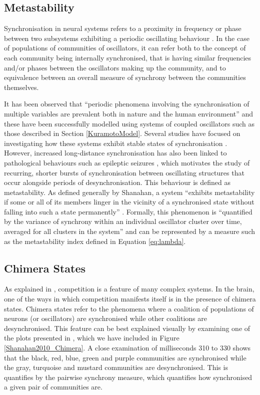 \documentclass[a4paper,11pt]{article}
\begin{document}
\subsection{Metastability}
\label{sec:bg:meta}
Synchronisation in neural systems refers to a proximity in frequency or phase between two subsystems exhibiting a periodic oscillating behaviour \cite{Abarbanel1996}. In the case of populations of communities of oscillators, it can refer both to the concept of each community being internally synchronised, that is having similar frequencies and/or phases between the oscillators making up the community, and to equivalence between an overall measure of synchrony between the communities themselves.

It has been observed that ``periodic phenomena involving the synchronisation of multiple variables are prevalent both in nature and the human environment'' \cite{Shanahan2010} and these have been successfully modelled using systems of coupled oscillators such as those described in Section \ref{KuramotoModel}. Several studies have focused on investigating how these systems exhibit stable states of synchronisation \cite{Acebron2005}. However, increased long-distance synchronisation has also been linked to pathological behaviours such as epileptic seizures \cite{Arthuis2009}, which motivates the study of recurring, shorter bursts of synchronisation between oscillating structures that occur alongside periods of desynchronisation. This behaviour is defined as metastability. As defined generally by Shanahan, a system ``exhibits metastability if some or all of its members linger in the vicinity of a synchronised state without falling into such a state permanently'' \cite{Shanahan2010}. Formally, this phenomenon is ``quantified by the variance of synchrony within an individual oscillator cluster over time, averaged for all clusters in the system'' \cite{Bhowmik2013} and can be represented by a measure such as the metastability index defined in Equation \ref{eq:lambda}.

\subsection{Chimera States}
\label{sec:bg:chimera}

As explained in \cite{Shanahan2010}, competition is a feature of many complex systems. In the brain, one of the ways in which competition manifests itself is in the presence of chimera states. Chimera states refer to the phenomena where a coalition of populations of neurons (or oscillators) are synchronised while other coalitions are desynchronised. This feature can be best explained visually by examining one of the plots presented in \cite{Shanahan2010}, which we have included in Figure \ref{Shanahan2010_Chimera}. A close examination of milliseconds 310 to 330 shows that the black, red, blue, green and purple communities are synchronised while the gray, turquoise and mustard communities are desynchronised. This is quantifies by the pairwise synchrony measure, which quantifies how synchronised a given pair of communities are.
\end{document}
